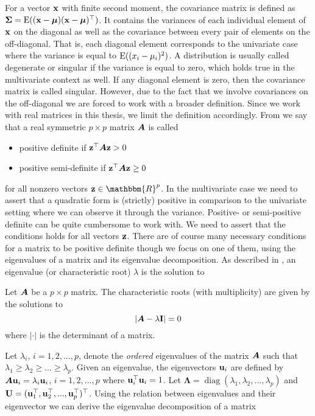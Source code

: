 \documentclass[]{book}
\begin{document}
For a vector $\mathbf{x}$ with finite second moment, the covariance matrix is defined as $\mathbf{\Sigma}=\operatorname{E}((\mathbf{x} - \mbox{\boldmath$\mu$})(\mathbf{x} - \mbox{\boldmath$\mu$})^\top)$. 
It contains the variances of each individual element of $\mathbf{x}$ on the diagonal as well as the covariance between every pair of elements on the off-diagonal. 
That is, each diagonal element corresponds to the univariate case where the variance is equal to $\operatorname{E}((x_i - \mu_i)^2)$. 
A distribution is usually called degenerate or singular if the variance is equal to zero, which holds true in the multivariate context as well. 
If any diagonal element is zero, then the covariance matrix is called singular.  
However, due to the fact that we involve covariances on the off-diagonal we are forced to work with a broader definition.  
Since we work with real matrices in this thesis, we limit the definition accordingly. From \citet[ch 14.2]{harville1997matrix} we say that a real symmetric $p\times p$ matrix $\mbox{\boldmath$A$}$ is called 
\begin{itemize}
	\item positive definite if $\mathbf{z}^\top \mbox{\boldmath$A$} \mathbf{z} > 0$
	\item positive semi-definite if $\mathbf{z}^\top \mbox{\boldmath$A$} \mathbf{z} \geq 0$
\end{itemize}
for all nonzero vectors $\bz \in \mathbbm{R}^p$.
In the multivariate case we need to assert that a quadratic form is (strictly) positive in comparison to the univariate setting where we can observe it through the variance. 
Positive- or semi-positive definite can be quite cumbersome to work with. We need to assert that the conditions holds for all vectors $\mathbf{z}$. 
There are of course many necessary conditions for a matrix to be positive definite though we focus on one of them, using the eigenvalues of a matrix and its eigenvalue decomposition. 
As described in \citet[ch. 21]{harville1997matrix}, an eigenvalue (or characteristic root) $\lambda$ is the solution to 
\begin{definition}\label{def:eigenvalue} 
	Let $\mbox{\boldmath$A$}$ be a $p\times p$ matrix. The characteristic roots (with multiplicity) are given by the solutions to
	\begin{equation*}
		\left|\mbox{\boldmath$A$} - \lambda \mathbf{I}\right| = 0
	\end{equation*}
	where $|\cdot|$ is the determinant of a matrix.
\end{definition} 
Let $\lambda_i$, $i=1,2,...,p$, denote the \textit{ordered} eigenvalues of the matrix $\mbox{\boldmath$A$}$ such that $\lambda_1\geq \lambda_2 \geq ... \geq \lambda_p$. Given an eigenvalue, the eigenvectors $\mathbf{u}_i$ are defined by $\mbox{\boldmath$A$} \mathbf{u}_i = \lambda_i \mathbf{u}_i$, $i=1,2,...,p$ where $\mathbf{u}_i^\top \mathbf{u}_i = 1$. 
Let $\boldsymbol{\Lambda} = \operatorname{diag}(\lambda_1, \lambda_2,...,\lambda_p)$ and $\mathbf{U}= (\mathbf{u}_1^\top, \mathbf{u}_2^\top, ..., \mathbf{u}_p^\top)^\top$. 
Using the relation between eigenvalues and their eigenvector we can derive the eigenvalue decomposition of a matrix 
\end{document}
